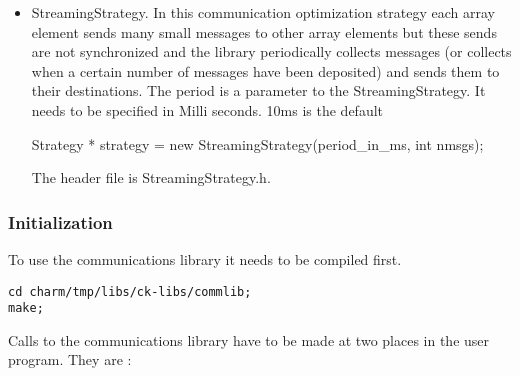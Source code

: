 \begin{itemize}
\item StreamingStrategy. In this communication optimization strategy 
each array element sends many small messages to other array elements
but these sends are not synchronized and the library periodically
collects messages (or collects when a certain number of messages have
been deposited) and sends them to their destinations. The period is a
parameter to the StreamingStrategy. It needs to be specified in Milli
seconds. 10ms is the default

Strategy * strategy = new StreamingStrategy(period\_in\_ms, int nmsgs);

The header file is StreamingStrategy.h.

\end{itemize}

\subsubsection{Initialization}

To use the communications library it needs to be compiled first.

\begin{verbatim}
cd charm/tmp/libs/ck-libs/commlib;
make;
\end{verbatim}

Calls to the communications library have to be made at two places in
the user program. They are :

